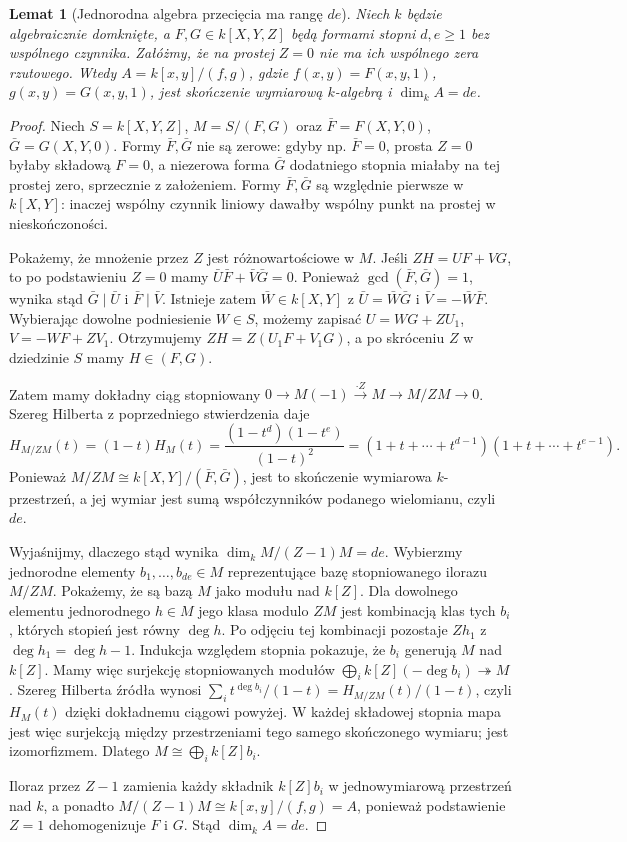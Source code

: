 \documentclass[11pt,a4paper,openany]{report}
\numberwithin{equation}{section}
\theoremstyle{plain}
\newtheorem{lemat}[twierdzenie]{Lemat}
\theoremstyle{definition}
\theoremstyle{remark}
\begin{document}
\begin{lemat}[Jednorodna algebra przecięcia ma rangę $de$]
\label{lem:bezout-rank}
Niech $k$ będzie algebraicznie domknięte,
a $F,G\in k[X,Y,Z]$ będą formami stopni $d,e\ge1$
bez wspólnego czynnika. Załóżmy, że na prostej $Z=0$
nie ma ich wspólnego zera rzutowego.
Wtedy $A=k[x,y]/(f,g)$, gdzie
$f(x,y)=F(x,y,1)$, $g(x,y)=G(x,y,1)$,
jest skończenie wymiarową $k$-algebrą i
$\dim_kA=de$.
\end{lemat}
\begin{proof}
Niech $S=k[X,Y,Z]$, $M=S/(F,G)$ oraz
$\bar F=F(X,Y,0)$, $\bar G=G(X,Y,0)$.
Formy $\bar F,\bar G$ nie są zerowe: gdyby np.
$\bar F=0$, prosta $Z=0$ byłaby składową $F=0$,
a niezerowa forma $\bar G$ dodatniego stopnia miałaby
na tej prostej zero, sprzecznie z założeniem. Formy
$\bar F,\bar G$ są względnie pierwsze w $k[X,Y]$:
inaczej wspólny czynnik liniowy dawałby wspólny punkt
na prostej w nieskończoności.

Pokażemy, że mnożenie przez $Z$ jest różnowartościowe
w $M$. Jeśli $ZH=UF+VG$, to po podstawieniu $Z=0$
mamy $\bar U\bar F+\bar V\bar G=0$.
Ponieważ $\gcd(\bar F,\bar G)=1$, wynika stąd
$\bar G\mid\bar U$ i $\bar F\mid\bar V$.
Istnieje zatem $\bar W\in k[X,Y]$ z
$\bar U=\bar W\bar G$ i $\bar V=-\bar W\bar F$.
Wybierając dowolne podniesienie $W\in S$, możemy zapisać
$U=WG+ZU_1$, $V=-WF+ZV_1$. Otrzymujemy
$ZH=Z(U_1F+V_1G)$, a po skróceniu $Z$
w dziedzinie $S$ mamy $H\in(F,G)$.

Zatem mamy dokładny ciąg stopniowany
$0\to M(-1)\xrightarrow{\cdot Z}M\to M/ZM\to0$.
Szereg Hilberta z poprzedniego stwierdzenia daje
\[
 H_{M/ZM}(t)=(1-t)H_M(t)
 =\frac{(1-t^d)(1-t^e)}{(1-t)^2}
 =(1+t+\cdots+t^{d-1})(1+t+\cdots+t^{e-1}).
\]
Ponieważ $M/ZM\cong k[X,Y]/(\bar F,\bar G)$,
jest to skończenie wymiarowa $k$-przestrzeń, a jej
wymiar jest sumą współczynników podanego wielomianu,
czyli $de$.

Wyjaśnijmy, dlaczego stąd wynika $\dim_kM/(Z-1)M=de$.
Wybierzmy jednorodne elementy $b_1,\ldots,b_{de}\in M$
reprezentujące bazę stopniowanego ilorazu $M/ZM$.
Pokażemy, że są bazą $M$ jako modułu nad $k[Z]$.
Dla dowolnego elementu jednorodnego $h\in M$ jego klasa
modulo $ZM$ jest kombinacją klas tych $b_i$, których
stopień jest równy $\deg h$. Po odjęciu tej kombinacji
pozostaje $Zh_1$ z $\deg h_1=\deg h-1$.
Indukcja względem stopnia pokazuje, że $b_i$ generują $M$
nad $k[Z]$. Mamy więc surjekcję stopniowanych modułów
$\bigoplus_i k[Z](-\deg b_i)\twoheadrightarrow M$.
Szereg Hilberta źródła wynosi
$\sum_i t^{\deg b_i}/(1-t)=H_{M/ZM}(t)/(1-t)$,
czyli $H_M(t)$ dzięki dokładnemu ciągowi powyżej.
W każdej składowej stopnia mapa jest więc surjekcją
między przestrzeniami tego samego skończonego wymiaru;
jest izomorfizmem. Dlatego $M\cong\bigoplus_i k[Z]b_i$.

Iloraz przez $Z-1$ zamienia każdy składnik $k[Z]b_i$
w jednowymiarową przestrzeń nad $k$, a ponadto
$M/(Z-1)M\cong k[x,y]/(f,g)=A$, ponieważ podstawienie
$Z=1$ dehomogenizuje $F$ i $G$. Stąd $\dim_kA=de$.
\end{proof}
\end{document}
